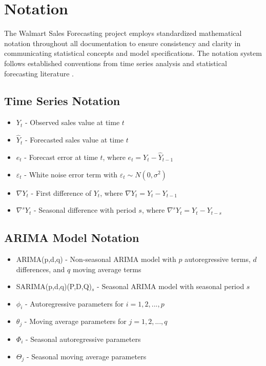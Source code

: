 		\section{Notation}
		
		The Walmart Sales Forecasting project employs standardized mathematical notation throughout all documentation to ensure consistency and clarity in communicating statistical concepts and model specifications. The notation system follows established conventions from time series analysis and statistical forecasting literature \cite{Box:2016}\cite{Montgomery:2008}.
		
		\subsection{Time Series Notation}
		\begin{itemize}
			\item $Y_t$ - Observed sales value at time $t$
			\item $\hat{Y}_t$ - Forecasted sales value at time $t$
			\item $e_t$ - Forecast error at time $t$, where $e_t = Y_t - \hat{Y}_{t-1}$
			\item $\varepsilon_t$ - White noise error term with $\varepsilon_t \sim N(0, \sigma^2)$
			\item $\nabla Y_t$ - First difference of $Y_t$, where $\nabla Y_t = Y_t - Y_{t-1}$
			\item $\nabla^s Y_t$ - Seasonal difference with period $s$, where $\nabla^s Y_t = Y_t - Y_{t-s}$
		\end{itemize}
		
		\subsection{ARIMA Model Notation}
		\begin{itemize}
			\item ARIMA(p,d,q) - Non-seasonal ARIMA model with $p$ autoregressive terms, $d$ differences, and $q$ moving average terms
			\item SARIMA(p,d,q)(P,D,Q)$_s$ - Seasonal ARIMA model with seasonal period $s$
			\item $\phi_i$ - Autoregressive parameters for $i = 1, 2, ..., p$
			\item $\theta_j$ - Moving average parameters for $j = 1, 2, ..., q$
			\item $\Phi_i$ - Seasonal autoregressive parameters
			\item $\Theta_j$ - Seasonal moving average parameters
		\end{itemize}
		
